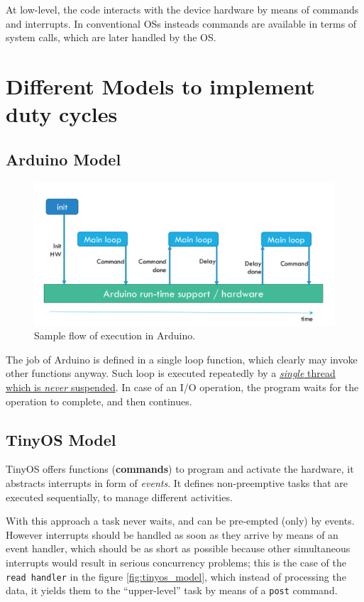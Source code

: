 At low-level, the code interacts with the device hardware by means of commands and interrupts. In conventional OSs insteads commands are available in terms of system calls, which are later handled by the OS.

\section{Different Models to implement duty cycles}
\subsection{Arduino Model}
\begin{figure}[htbp]
   \centering
   \includegraphics{images/arduino_model.png}
   \caption{Sample flow of execution in Arduino.}
   \label{fig:arduino_model}
\end{figure}
The job of Arduino is defined in a single loop function, which clearly may invoke other functions anyway.
Such loop is executed repeatedly by a \ul{\textit{single} thread which is \textit{never} suspended}.
In case of an I/O operation, the program waits for the operation to complete, and then continues.

\subsection{TinyOS Model}

TinyOS offers functions (\textbf{commands}) to program and activate the hardware, it abstracts interrupts in form of \textit{events}.
It defines non-preemptive tasks that are executed sequentially, to manage different activities.

With this approach a task never waits, and can be pre-empted (only) by events. However interrupts should be handled as soon
as they arrive by means of an event handler, which should be as short as possible because other simultaneous interrupts would result in serious concurrency problems;
this is the case of the \texttt{read handler} in the figure \ref{fig:tinyos_model}, which instead of processing the data, it yields them to the ``upper-level'' task by means of a \texttt{post} command. 

